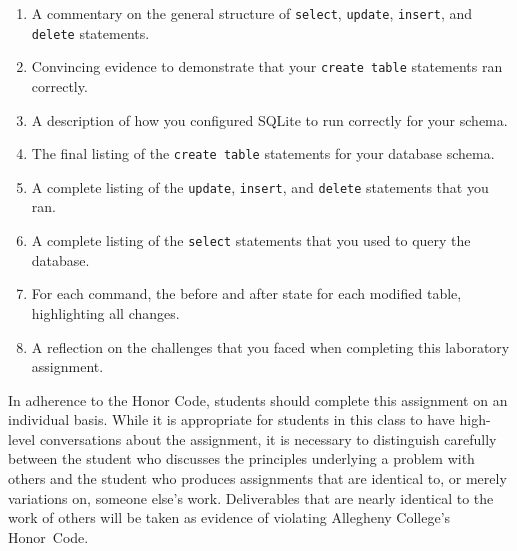\begin{enumerate}
    \setlength{\itemsep}{0pt}
  \item A commentary on the general structure of {\tt select}, {\tt update}, {\tt insert}, and {\tt delete} statements.
  \item Convincing evidence to demonstrate that your {\tt create table} statements ran correctly.
  \item A description of how you configured SQLite to run correctly for your schema.
  \item The final listing of the {\tt create table} statements for your database schema.
  \item A complete listing of the {\tt update}, {\tt insert}, and {\tt delete} statements that you ran.
  \item A complete listing of the {\tt select} statements that you used to query the database.
  \item For each command, the before and after state for each modified table, highlighting all changes.
  \item A reflection on the challenges that you faced when completing this laboratory assignment.
\end{enumerate}


In adherence to the Honor Code, students should complete this assignment on an individual basis. While it is appropriate
for students in this class to have high-level conversations about the assignment, it is necessary to distinguish
carefully between the student who discusses the principles underlying a problem with others and the student who produces
assignments that are identical to, or merely variations on, someone else's work.  Deliverables that are nearly identical
to the work of others will be taken as evidence of violating Allegheny College's \mbox{Honor Code}.



